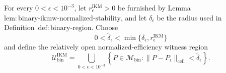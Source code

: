 For every \(0<\epsilon<10^{-3}\), let \(r_\epsilon^{\mathrm{IKM}}>0\) be furnished by Lemma~\(\mathrm{lem{:}binary\text{-}ikmw\text{-}normalized\text{-}stability}\), and let \(\delta_\epsilon\) be the radius used in Definition~\(\mathrm{def{:}binary\text{-}region}\). Choose
\[
 0<\widetilde\delta_\epsilon
 <\min\{\delta_\epsilon,r_\epsilon^{\mathrm{IKM}}\}
\]
and define the relatively open normalized-efficiency witness region
\[
 \mathcal U_{\mathrm{bin}}^{\mathrm{IKM}}
 =\bigcup_{0<\epsilon<10^{-3}}
 \left\{P\in\mathcal M_{\mathrm{bin}}:
 \|P-P_\epsilon\|_{\mathrm{cell}}<\widetilde\delta_\epsilon\right\}.
\]